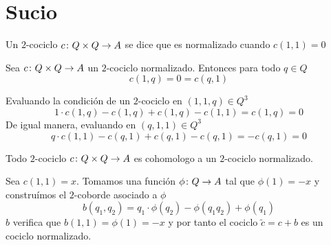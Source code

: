 
\chapter{Sucio}


\begin{definicion}
	Un $2$-cociclo $c\colon Q\times Q\to A$ se dice que es normalizado cuando $c(1,1)= 0$
\end{definicion}

\begin{proposicion}
	Sea $c\colon Q\times Q\to A$ un $2$-cociclo normalizado. Entonces para todo $q\in Q$
	\begin{equation*}
		c(1,q)=0=c(q,1)
	\end{equation*}
	\begin{demostracion}
		Evaluando la condición de un $2$-cociclo en $(1,1,q)\in Q^3$
		\begin{equation*}
			1\cdot c(1,q) - c(1,q) + c(1,q) - c(1,1) = c(1,q) =0
		\end{equation*} 
		De igual manera, evaluando en $(q,1,1)\in Q^3$
		\begin{equation*}
			q\cdot c(1,1) - c(q,1) + c(q,1) - c(q,1) = -c(q,1) = 0
		\end{equation*}
		
	\end{demostracion}
\end{proposicion}

\begin{proposicion}\label{prop:normcoc}
	Todo $2$-cociclo $c\colon Q\times Q\to A$ es cohomologo a un $2$-cociclo normalizado. %
	\begin{demostracion}
		Sea $c(1,1) = x$. Tomamos una función $\phi\colon Q\to A$ tal que $\phi(1) = -x$ y construímos el $2$-coborde asociado a $\phi$
		\begin{equation*}
			b(q_1,q_2) = q_1\cdot \phi(q_2) - \phi(q_1q_2) + \phi(q_1)
		\end{equation*}
		$b$ verifica que $b(1,1) = \phi(1) = -x$ y por tanto el cociclo $\tilde c = c+b$ es un cociclo normalizado.
	\end{demostracion}
\end{proposicion}




